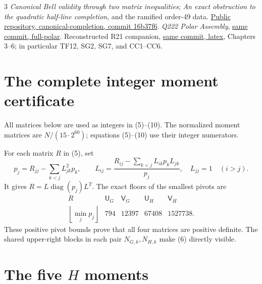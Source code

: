 \documentclass[10pt]{article}
\begin{document}
\begin{thebibliography}{3}\small
{} \emph{Canonical Bell validity through two matrix inequalities};
\emph{An exact obstruction to the quadratic half-line completion},
and the ramified order-49 data.
\href{https://github.com/anubhav70747/q222-finite-sdp/tree/16b37f6deb198fa48134145b4d12b7cc7d37be36/extracted-lifts/canonical-completion}{Public repository, canonical-completion, commit 16b37f6}.
 \emph{Q222 Polar Assembly},
\href{https://github.com/anubhav70747/q222-finite-sdp/tree/16b37f6deb198fa48134145b4d12b7cc7d37be36/extracted-lifts/canonical-completion/full-polar}{same commit, full-polar}.
 Reconstructed R21 companion,
\href{https://github.com/anubhav70747/q222-finite-sdp/tree/16b37f6deb198fa48134145b4d12b7cc7d37be36/latex}{same commit, latex},
Chapters 3--6; in particular TF12, SG2, SG7, and CC1--CC6.
\end{thebibliography}

\clearpage
\appendix
\section{The complete integer moment certificate}\label{app:data}
All matrices below are used as integers in (5)--(10).
The normalized moment matrices are $N/(15\cdot2^{60})$; equations
(5)--(10) use their integer numerators.

For each matrix $R$ in (5), set
\[
 p_j=R_{jj}-\sum_{k<j}L_{jk}^2p_k,\qquad
 L_{ij}=\frac{R_{ij}-\sum_{k<j}L_{ik}p_kL_{jk}}{p_j},
 \quad L_{jj}=1\quad(i>j).
\]
It gives $R=L\operatorname{diag}(p_j)L^T$. The exact floors of the
smallest pivots are
\[
\begin{array}{c|rrrr}
 R&\mathsf U_G&\mathsf V_G&\mathsf U_H&\mathsf V_H\\\hline
 \left\lfloor\min_jp_j\right\rfloor&794&12397&67408&1527738.
\end{array}
\]
These positive pivot bounds prove that all four matrices are positive definite. The shared
upper-right blocks in each pair
$N_{G,k},N_{H,k}$ make (6) directly visible.


\clearpage
\section*{The five $H$ moments}

\end{document}
